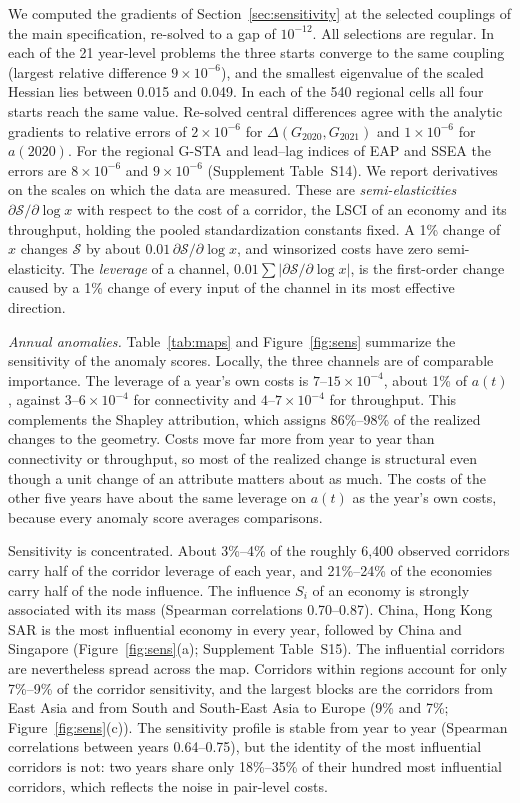 \documentclass[12pt]{article}
\theoremstyle{definition}
\begin{document}
We computed the gradients of Section~\ref{sec:sensitivity} at the selected couplings of the main specification, re-solved to a gap of $10^{-12}$. All selections are regular. In each of the 21 year-level problems the three starts converge to the same coupling (largest relative difference $9\times10^{-6}$), and the smallest eigenvalue of the scaled Hessian lies between 0.015 and 0.049. In each of the 540 regional cells all four starts reach the same value. Re-solved central differences agree with the analytic gradients to relative errors of $2\times10^{-6}$ for $\Delta(G_{2020},G_{2021})$ and $1\times10^{-6}$ for $a(2020)$. For the regional G-STA and lead--lag indices of EAP and SSEA the errors are $8\times10^{-6}$ and $9\times10^{-6}$ (Supplement Table~S14). We report derivatives on the scales on which the data are measured. These are \emph{semi-elasticities} $\partial\mathcal S/\partial\log x$ with respect to the cost of a corridor, the LSCI of an economy and its throughput, holding the pooled standardization constants fixed. A 1\% change of $x$ changes $\mathcal S$ by about $0.01\,\partial\mathcal S/\partial\log x$, and winsorized costs have zero semi-elasticity. The \emph{leverage} of a channel, $0.01\sum|\partial\mathcal S/\partial\log x|$, is the first-order change caused by a 1\% change of every input of the channel in its most effective direction.

\emph{Annual anomalies.} Table~\ref{tab:maps} and Figure~\ref{fig:sens} summarize the sensitivity of the anomaly scores. Locally, the three channels are of comparable importance. The leverage of a year's own costs is $7$--$15\times10^{-4}$, about 1\% of $a(t)$, against $3$--$6\times10^{-4}$ for connectivity and $4$--$7\times10^{-4}$ for throughput. This complements the Shapley attribution, which assigns 86\%--98\% of the realized changes to the geometry. Costs move far more from year to year than connectivity or throughput, so most of the realized change is structural even though a unit change of an attribute matters about as much. The costs of the other five years have about the same leverage on $a(t)$ as the year's own costs, because every anomaly score averages comparisons.

Sensitivity is concentrated. About 3\%--4\% of the roughly 6{,}400 observed corridors carry half of the corridor leverage of each year, and 21\%--24\% of the economies carry half of the node influence. The influence $S_i$ of an economy is strongly associated with its mass (Spearman correlations 0.70--0.87). China, Hong Kong SAR is the most influential economy in every year, followed by China and Singapore (Figure~\ref{fig:sens}(a); Supplement Table~S15). The influential corridors are nevertheless spread across the map. Corridors within regions account for only 7\%--9\% of the corridor sensitivity, and the largest blocks are the corridors from East Asia and from South and South-East Asia to Europe (9\% and 7\%; Figure~\ref{fig:sens}(c)). The sensitivity profile is stable from year to year (Spearman correlations between years 0.64--0.75), but the identity of the most influential corridors is not: two years share only 18\%--35\% of their hundred most influential corridors, which reflects the noise in pair-level costs.
\end{document}
